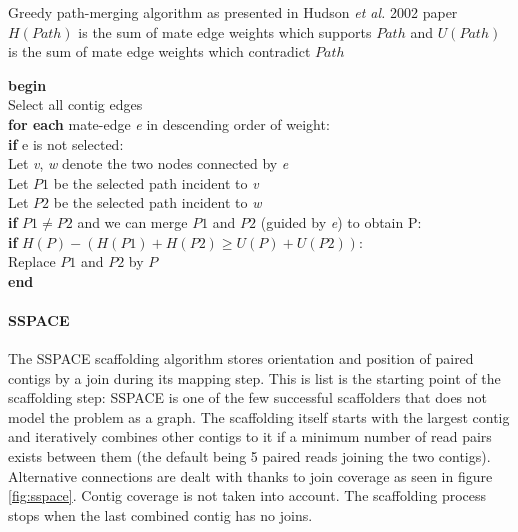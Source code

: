 \documentclass[12pt]{article}
\begin{document}
\begin{algorithm}[h!]
\caption{Greedy path-merging algorithm as presented in Hudson \textit{et al.} 2002 paper \\ \footnotesize $H(Path)$ is the sum of mate edge weights which supports $Path$ and $U(Path)$ is the sum of mate edge weights which contradict $Path$}
\textbf{begin} \\
Select all contig edges \\
\textbf{for each} mate-edge \textit{e} in descending order of weight: \\
\hspace*{1cm}\textbf{if} e is not selected: \\
\hspace*{2cm}Let \textit{v}, \textit{w} denote the two nodes connected by \textit{e} \\
\hspace*{2cm}Let $P1$ be the selected path incident to \textit{v} \\
\hspace*{2cm}Let $P2$ be the selected path incident to \textit{w} \\
\hspace*{2cm}\textbf{if} $P1 \neq P2$ and we can merge $P1$ and $P2$ (guided by \textit{e}) to obtain P: \\
\hspace*{3cm}\textbf{if} $H(P) - (H(P1) + H(P2) \geq U(P)+U(P2))$: \\
\hspace*{4cm}Replace $P1$ and $P2$ by $P$ \\
\textbf{end}
\end{algorithm}

\paragraph*{SSPACE}
The SSPACE scaffolding algorithm stores orientation and position of paired contigs by a join during its mapping step. This is list is the starting point of the scaffolding step: SSPACE is one of the few successful scaffolders that does not model the problem as a graph. The scaffolding itself starts with the largest contig and iteratively combines other contigs to it if a minimum number of read pairs exists between them (the default being 5 paired reads joining the two contigs). Alternative connections are dealt with thanks to join coverage as seen in figure \ref{fig:sspace}. Contig coverage is not taken into account. The scaffolding process stops when the last combined contig has no joins.
\end{document}
